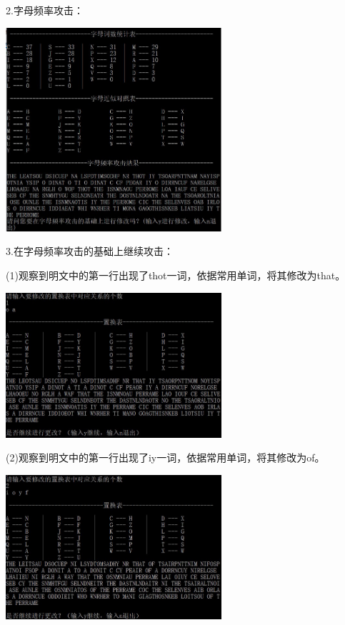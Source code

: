 \documentclass[UTF8,a4paper]{article}
\begin{document}
	2.字母频率攻击：\par 
			\begin{center}
		\includegraphics[width=0.6\textwidth]{2attack2.JPG}
	\end{center}

	3.在字母频率攻击的基础上继续攻击：\par 
	(1)观察到明文中的第一行出现了thot一词，依据常用单词，将其修改为that。
				\begin{center}
		\includegraphics[width=0.6\textwidth]{pic1.JPG}
	\end{center}

	(2)观察到明文中的第一行出现了iy一词，依据常用单词，将其修改为of。\par 
					\begin{center}
		\includegraphics[width=0.6\textwidth]{pic2.JPG}
	\end{center}
\end{document}
